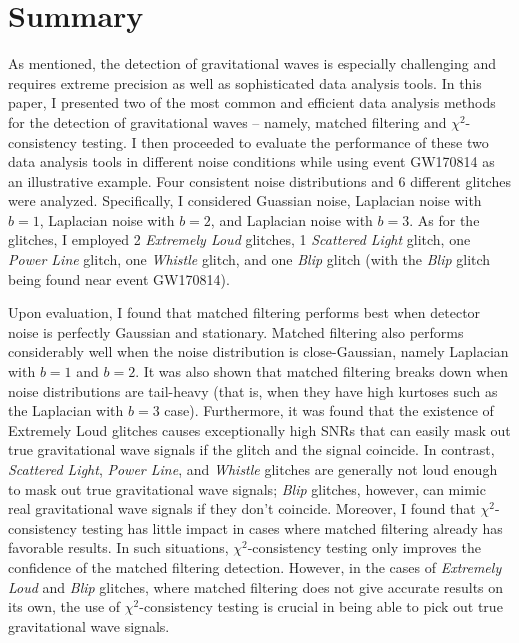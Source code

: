 \documentclass[preprint,
letterpaper,
 amsmath,amssymb,
 aps,
]{revtex4-2}
\begin{document}
\section{Summary} \label{summary}
As mentioned, the detection of gravitational waves is especially challenging and requires extreme precision as well as sophisticated data analysis tools. In this paper, I presented two of the most common and efficient data analysis methods for the detection of gravitational waves – namely, matched filtering and $\chi^2$-consistency testing. I then proceeded to evaluate the performance of these two data analysis tools in different noise conditions while using event GW170814 as an illustrative example. Four consistent noise distributions and 6 different glitches were analyzed. Specifically, I considered Guassian noise, Laplacian noise with $b=1$, Laplacian noise with $b=2$, and Laplacian noise with $b=3$. As for the glitches, I employed 2 \textit{Extremely Loud} glitches, 1 \textit{Scattered Light} glitch, one \textit{Power Line} glitch, one \textit{Whistle} glitch, and one \textit{Blip} glitch (with the \textit{Blip} glitch being found near event GW170814).

Upon evaluation, I found that matched filtering performs best when detector noise is perfectly Gaussian and stationary. Matched filtering also performs considerably well when the noise distribution is close-Gaussian, namely Laplacian with $b=1$ and $b=2$. It was also shown that matched filtering breaks down when noise distributions are tail-heavy (that is, when they have high kurtoses such as the Laplacian with $b=3$ case). Furthermore, it was found that the existence of Extremely Loud glitches causes exceptionally high SNRs that can easily mask out true gravitational wave signals if the glitch and the signal coincide. In contrast, \textit{Scattered Light}, \textit{Power Line}, and \textit{Whistle} glitches are generally not loud enough to mask out true gravitational wave signals; \textit{Blip} glitches, however, can mimic real gravitational wave signals if they don't coincide. Moreover, I found that $\chi^2$-consistency testing has little impact in cases where matched filtering already has favorable results. In such situations, $\chi^2$-consistency testing only improves the confidence of the matched filtering detection. However, in the cases of \textit{Extremely Loud} and \textit{Blip} glitches, where matched filtering does not give accurate results on its own, the use of $\chi^2$-consistency testing is crucial in being able to pick out true gravitational wave signals. 
\end{document}
